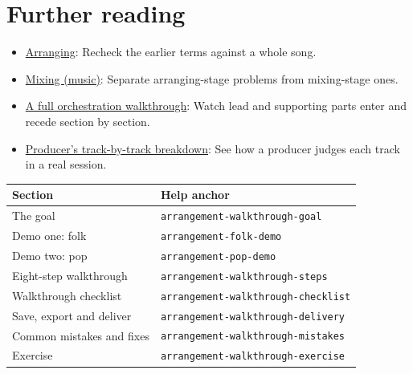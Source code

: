 \section{Further reading}
\label{sec:10-walkthrough-further-reading}
\begin{itemize}
  \item \href{https://en.wikipedia.org/wiki/Arranging}{Arranging}: Recheck the earlier terms against a whole song.
  \item \href{https://en.wikipedia.org/wiki/Mixing_(music)}{Mixing (music)}: Separate arranging-stage problems from mixing-stage ones.
  \item \href{https://www.youtube.com/watch?v=Mf6ZKAV0ZU4}{A full orchestration walkthrough}: Watch lead and supporting parts enter and recede section by section.
  \item \href{https://www.youtube.com/watch?v=KS89XfqFE9A}{Producer's track-by-track breakdown}: See how a producer judges each track in a real session.
\end{itemize}

\begin{helpmapping}
\begin{longtable}{p{}p{}}
\toprule
Section & Help anchor \\
\midrule
The goal & \texttt{arrangement-walkthrough-goal} \\
Demo one: folk & \texttt{arrangement-folk-demo} \\
Demo two: pop & \texttt{arrangement-pop-demo} \\
Eight-step walkthrough & \texttt{arrangement-walkthrough-steps} \\
Walkthrough checklist & \texttt{arrangement-walkthrough-checklist} \\
Save, export and deliver & \texttt{arrangement-walkthrough-delivery} \\
Common mistakes and fixes & \texttt{arrangement-walkthrough-mistakes} \\
Exercise & \texttt{arrangement-walkthrough-exercise} \\
\bottomrule
\end{longtable}
\end{helpmapping}
